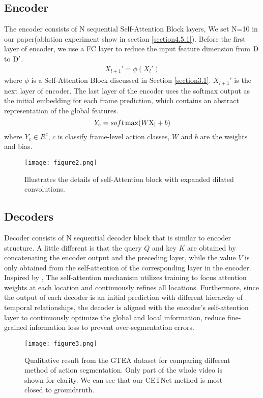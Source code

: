\documentclass[runningheads]{llncs}
\begin{document}
\subsection{Encoder}\label{section3.2}
\par{
	The encoder consists of N sequential Self-Attention Block layers, We set N=10 in our paper(ablation experiment show in section \ref{section4.5.1}). Before the first layer of encoder, we use a FC layer to reduce the input feature dimension from ${\rm{D}}$ to ${\rm{D'}}$.
}
\begin{equation}
	\begin{aligned}	
		X_{l + 1}' = \phi (X_l')
	\end{aligned}
\end{equation}
\noindent where $\phi$ is a Self-Attention Block discussed in Section \ref{section3.1}. $X_{l + 1}'$ is the next layer of encoder. The last layer of the encoder uses the softmax output as the initial embedding for each frame prediction, which contains an abstract representation of the global features. 
\begin{equation}
	{Y_{\rm{c}}} = soft\max (W{{\rm{X}}_{\rm{l}}} + b)
\end{equation}
\noindent where ${Y_c} \in {R^c}$, $c$ is classify frame-level action classes, $W$ and $b$ are the weights and bias.
\begin{figure}
	\centering
	\texttt{[image: figure2.png]}
	\caption{Illustrates the details of self-Attention block with expanded dilated convolutions.}
	\label{FIG2}
\end{figure}
\subsection{Decoders}\label{section3.3}
\par{
	Decoder consists of N sequential decoder block that is similar to encoder structure. A little different is that the query $Q$ and key $K$ are obtained by concatenating the encoder output and the preceding layer, while the value $V$ is only obtained from the self-attention of the corresponding layer in the encoder. Inspired by \cite{yi2021asformer}, The self-attention mechanism utilizes training to focus attention weights at each location and continuously refines all locations. Furthermore, since the output of each decoder is an initial prediction with different hierarchy of temporal relationships, the decoder is aligned with the encoder's self-attention layer to continuously optimize the global and local information, reduce fine-grained information loss to prevent over-segmentation errors.
}
\begin{figure*}
	\centering
	\texttt{[image: figure3.png]}
	\caption{Qualitative result from the GTEA dataset for comparing different method of action segmentation. Only part of the whole video is shown for clarity. We can see that our CETNet method is most closed to groundtruth.}
	\label{FIG3}
\end{figure*}
\end{document}
